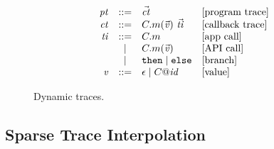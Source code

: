 \begin{figure}[t]
  \small
  \begin{displaymath}
    \begin{array}{rcll}
      \mathit{pt} & ::= & \vec{\mathit{ct}}  & \text{[program trace]} \\
      \mathit{ct} & ::= & C.m(\vec{\mathit{v}})\ \vec{\mathit{ti}} & \text{[callback trace]} \\
      \mathit{ti} & ::= & C.m  & \text{[app call]} \\
               & \mid & C.m (\vec{\mathit{v}})  & \text{[API call]} \\
               & \mid & \texttt{then} \mid \texttt{else} & \text{[branch]} \\
      \mathit{v} & ::= & \epsilon \mid C@\mathit{id}  & \text{[value]} \\
    \end{array}
  \end{displaymath}
  \caption{Dynamic traces.}
  \label{fig:traces}
\end{figure}


\subsection{Sparse Trace Interpolation}
\label{sec:bisimulation}


